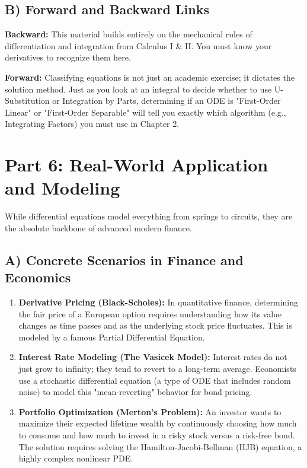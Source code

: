 \documentclass[11pt]{article}
\begin{document}
\subsection{B) Forward and Backward Links}
\textbf{Backward:} This material builds entirely on the mechanical rules of differentiation and integration from Calculus I \& II. You must know your derivatives to recognize them here. 

\textbf{Forward:} Classifying equations is not just an academic exercise; it dictates the solution method. Just as you look at an integral to decide whether to use U-Substitution or Integration by Parts, determining if an ODE is "First-Order Linear" or "First-Order Separable" will tell you exactly which algorithm (e.g., Integrating Factors) you must use in Chapter 2. 

\section{Part 6: Real-World Application and Modeling}

While differential equations model everything from springs to circuits, they are the absolute backbone of advanced modern finance.

\subsection{A) Concrete Scenarios in Finance and Economics}
\begin{enumerate}
    \item \textbf{Derivative Pricing (Black-Scholes):} In quantitative finance, determining the fair price of a European option requires understanding how its value changes as time passes and as the underlying stock price fluctuates. This is modeled by a famous Partial Differential Equation.
    \item \textbf{Interest Rate Modeling (The Vasicek Model):} Interest rates do not just grow to infinity; they tend to revert to a long-term average. Economists use a stochastic differential equation (a type of ODE that includes random noise) to model this "mean-reverting" behavior for bond pricing.
    \item \textbf{Portfolio Optimization (Merton's Problem):} An investor wants to maximize their expected lifetime wealth by continuously choosing how much to consume and how much to invest in a risky stock versus a risk-free bond. The solution requires solving the Hamilton-Jacobi-Bellman (HJB) equation, a highly complex nonlinear PDE.
\end{enumerate}
\end{document}

